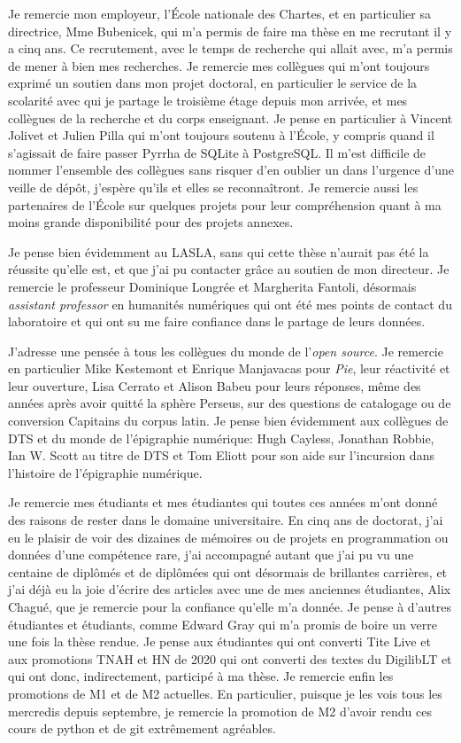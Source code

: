 Je remercie mon employeur, l'École nationale des Chartes, et en particulier sa directrice, Mme Bubenicek, qui m'a permis de faire ma thèse en me recrutant il y a cinq ans. Ce recrutement, avec le temps de recherche qui allait avec, m'a permis de mener à bien mes recherches. Je remercie mes collègues qui m'ont toujours exprimé un soutien dans mon projet doctoral, en particulier le service de la scolarité avec qui je partage le troisième étage depuis mon arrivée, et mes collègues de la recherche et du corps enseignant. Je pense en particulier à Vincent Jolivet et Julien Pilla qui m'ont toujours soutenu à l'École, y compris quand il s'agissait de faire passer Pyrrha de SQLite à PostgreSQL. Il m'est difficile de nommer l'ensemble des collègues sans risquer d'en oublier un dans l'urgence d'une veille de dépôt, j'espère qu'ils et elles se reconnaîtront. Je remercie aussi les partenaires de l'École sur quelques projets pour leur compréhension quant à ma moins grande disponibilité pour des projets annexes.

Je pense bien évidemment au LASLA, sans qui cette thèse n'aurait pas été la réussite qu'elle est, et que j'ai pu contacter grâce au soutien de mon directeur. Je remercie le professeur Dominique Longrée et 
Margherita Fantoli, désormais \textit{assistant professor} en humanités numériques qui ont été mes points de contact du laboratoire et qui ont su me faire confiance dans le partage de leurs données.

J'adresse une pensée à tous les collègues du monde de l'\textit{open source}. Je remercie en particulier Mike Kestemont et Enrique Manjavacas pour \textit{Pie}, leur réactivité et leur ouverture, Lisa Cerrato et Alison Babeu pour leurs réponses, même des années après avoir quitté la sphère Perseus, sur des questions de catalogage ou de conversion Capitains du corpus latin. Je pense bien évidemment aux collègues de DTS et du monde de l'épigraphie numérique: Hugh Cayless, Jonathan Robbie, Ian W. Scott au titre de DTS et Tom Eliott pour son aide sur l'incursion dans l'histoire de l'épigraphie numérique. 

Je remercie mes étudiants et mes étudiantes qui toutes ces années m'ont donné des raisons de rester dans le domaine universitaire. En cinq ans de doctorat, j'ai eu le plaisir de voir des dizaines de mémoires ou de projets en programmation ou données d'une compétence rare, j'ai accompagné autant que j'ai pu vu une centaine de diplômés et de diplômées qui ont désormais de brillantes carrières, et j'ai déjà eu la joie d'écrire des articles avec une de mes anciennes étudiantes, Alix Chagué, que je remercie pour la confiance qu'elle m'a donnée. Je pense à d'autres étudiantes et étudiants, comme Edward Gray qui m'a promis de boire un verre une fois la thèse rendue. Je pense aux étudiantes qui ont converti Tite Live et aux promotions TNAH et HN de 2020 qui ont converti des textes du DigilibLT et qui ont donc, indirectement, participé à ma thèse. Je remercie enfin les promotions de M1 et de M2 actuelles. En particulier, puisque je les vois tous les mercredis depuis septembre, je remercie la promotion de M2 d'avoir rendu ces cours de python et de git extrêmement agréables.

